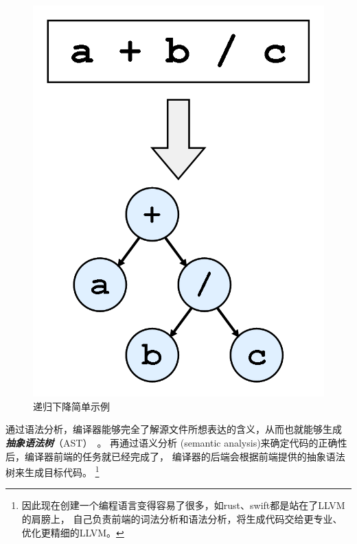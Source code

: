 \begin{figure}[hbt]
	\centering
	\includegraphics[scale=.4]{recursive-decent.png}
	\caption{递归下降简单示例}\label{fig:recursive-decent}
\end{figure}

通过语法分析，编译器能够完全了解源文件所想表达的含义，从而也就能够生成
{\bf\it 抽象语法树}（AST）~\cite{baxter1998clone}。
再通过语义分析 (semantic analysis)来确定代码的正确性后，编译器前端的任务就已经完成了，
编译器的后端会根据前端提供的抽象语法树来生成目标代码。
\footnote{因此现在创建一个编程语言变得容易了很多，如rust、swift都是站在了LLVM的肩膀上，
	自己负责前端的词法分析和语法分析，将生成代码交给更专业、优化更精细的LLVM。}
